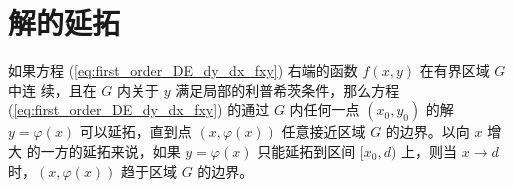 \section{解的延拓}\label{sec:解的延拓}
\begin{theorem}[解的延拓定理]\label{thm:solution_extension_theorem}
如果方程 (\ref{eq:first_order_DE_dy_dx_fxy}) 右端的函数 $f(x,y)$ 在有界区域 $G$ 中连
续，且在 $G$ 内关于 $y$ 满足局部的利普希茨条件，那么方程 (\ref{eq:first_order_DE_dy_dx_fxy}) 的通过 $G$ 内任何一点
$(x_0,y_0)$ 的解 $y=\varphi(x)$ 可以延拓，直到点 $(x,\varphi(x))$ 任意接近区域 $G$ 的边界。以向 $x$ 增大
的一方的延拓来说，如果 $y=\varphi(x)$ 只能延拓到区间 $[x_0,d)$ 上，则当 $x \to d$ 时，$(x,\varphi(x))$
趋于区域 $G$ 的边界。
\end{theorem}